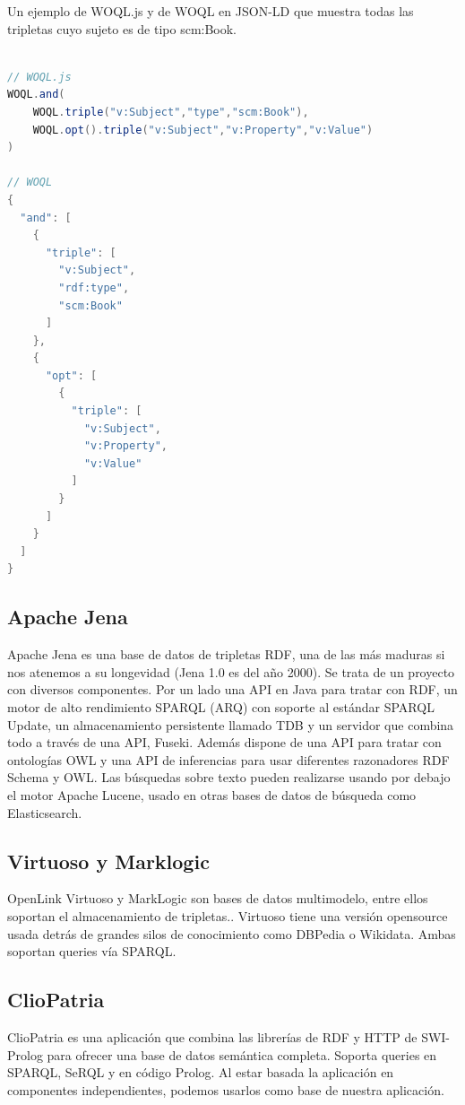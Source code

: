 \documentclass[12pt]{report} %
\begin{document}
Un ejemplo de WOQL.js y de WOQL en JSON-LD que muestra todas las tripletas cuyo sujeto es de tipo scm:Book.

\begin{lstlisting}[language=Java]

// WOQL.js
WOQL.and(
    WOQL.triple("v:Subject","type","scm:Book"),
    WOQL.opt().triple("v:Subject","v:Property","v:Value")
)

// WOQL
{
  "and": [
    {
      "triple": [
        "v:Subject",
        "rdf:type",
        "scm:Book"
      ]
    },
    {
      "opt": [
        {
          "triple": [
            "v:Subject",
            "v:Property",
            "v:Value"
          ]
        }
      ]
    }
  ]
}
\end{lstlisting}

\subsection{Apache Jena}
Apache Jena es una base de datos de tripletas RDF, una de las más maduras si nos atenemos a su longevidad (Jena 1.0 es del año 2000).\cite{jena}
Se trata de un proyecto con diversos componentes. Por un lado una API en Java para tratar con RDF, un motor de alto rendimiento SPARQL (ARQ) con soporte al estándar SPARQL Update, un almacenamiento persistente llamado TDB y un servidor que combina todo a través de una API, Fuseki. Además dispone de una API para tratar con ontologías OWL y una API de inferencias para usar diferentes razonadores RDF Schema y OWL. Las búsquedas sobre texto pueden realizarse usando por debajo el motor Apache Lucene, usado en otras bases de datos de búsqueda como Elasticsearch.


\subsection{Virtuoso y Marklogic}
OpenLink Virtuoso y MarkLogic son bases de datos multimodelo, entre ellos soportan el almacenamiento de tripletas.\cite{virtuoso}\cite{marklogic}.
Virtuoso tiene una versión opensource usada detrás de grandes silos de conocimiento como DBPedia o Wikidata. Ambas soportan queries vía SPARQL.

\subsection{ClioPatria}
ClioPatria es una aplicación que combina las librerías de RDF y HTTP de SWI-Prolog para ofrecer una base de datos semántica completa.\cite{cliopatria}
Soporta queries en SPARQL, SeRQL y en código Prolog. Al estar basada la aplicación en componentes independientes, podemos usarlos como base de nuestra aplicación.
\end{document}
